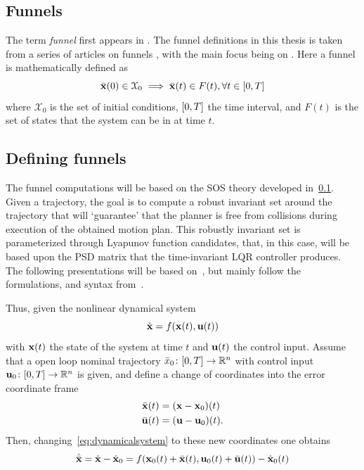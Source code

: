 \subsection{Funnels}
\label{sec:Funnels}

The term \textit{funnel} first appears in \cite{masonMechanicsManipulation1985}.
The funnel definitions in this thesis is taken from a series of articles on
funnels \cite{Tobenkin_2011,tedrakeLQRtreesFeedbackMotion2009,
  majumdarRobustOnlineMotion2013,
  majumdarFunnelLibrariesRealtime2017,ahmadi2014dsos}, with the main focus being
on \cite{majumdarFunnelLibrariesRealtime2017}. Here a funnel is mathematically
defined as
\[
  \bar{\mathbf{x}}(0) \in \mathcal{X}_0 \implies \bar{\mathbf{x}}(t) \in F(t),
  \forall t \in \lbrack0,T\rbrack
\]
where \(\mathcal{X}_0\) is the set of initial conditions, \(\lbrack0,T\rbrack\) the time
interval, and \(F(t)\) is the set of states that the system can be in at time
\(t\).

\subsection{Defining funnels}

The funnel computations will be based on the \ac{SOS} theory developed
in~\cref{sec:Funnels}. Given a trajectory, the goal is to compute a robust
invariant set around the trajectory that will `guarantee' that the planner is
free from collisions during execution of the obtained motion plan. This robustly
invariant set is parameterized through Lyapunov function candidates, that, in
this case, will be based upon the \ac{PSD} matrix that the time-invariant
\ac{LQR} controller produces. The following presentations will be based
on~\cite{Tobenkin_2011, tedrakeLQRtreesFeedbackMotion2009,
  majumdarRobustOnlineMotion2013}, but mainly follow the formulations, and
syntax from~\cite{majumdarFunnelLibrariesRealtime2017}.

Thus, given the nonlinear dynamical system
\begin{equation}
  \label{eq:dynamicalsystem}
  \dot{\mathbf{x}} = f(\mathbf{x}(t), \mathbf{u}(t))
\end{equation}
with \(\mathbf{x}(t)\) the state of the system at time \(t\) and \(\mathbf{u}(t)\)
the control input. Assume that a open loop nominal trajectory \(\bar{x}_0 \colon
[0,T] \rightarrow \mathbb{R}^n\) with control input \(\mathbf{u}_0 \colon [0,T]
\rightarrow \mathbb{R}^n\) is given, and define a change of coordinates into the error
coordinate frame
\begin{align}
  \bar{\mathbf{x}}(t) &= (\mathbf{x} - \mathbf{x}_0)(t) \\
  \bar{\mathbf{u}}(t) &= (\mathbf{u} - \mathbf{u}_0)(t).
\end{align}
Then, changing~\cref{eq:dynamicalsystem} to these new coordinates one obtains
\begin{equation}
  \label{eq:dynamicalsystem-coordinatechange}
  \dot{\bar{\mathbf{x}}} = \dot{\mathbf{x}} - \dot{\mathbf{x}}_0 = f(\mathbf{x}_0(t) + \bar{\mathbf{x}}(t), \mathbf{u}_0(t) + \bar{\mathbf{u}}(t)) - \dot{\mathbf{x}}_0(t)
\end{equation}

